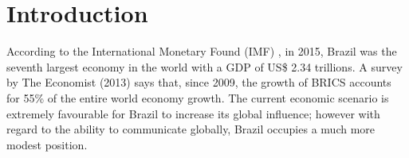 \documentclass[twocolumn]{bmcart}%
\begin{document}
\begin{frontmatter}
\begin{abstractbox}

\begin{keyword}
\end{keyword}


\end{abstractbox}
%

\end{frontmatter}




\pagestyle{plain}
\section{Introduction}
According to the International Monetary Found (IMF) \cite{IMF2015}, in 2015, Brazil was the seventh largest economy in the world with a GDP of US\$ 2.34 trillions. A survey by The Economist (2013) says that, since 2009, the growth of BRICS accounts for 55\% of the entire world economy growth. The current economic scenario is extremely favourable for Brazil to increase its global influence; however with regard to the ability to communicate globally, Brazil occupies a much more modest position. 
\end{document}
